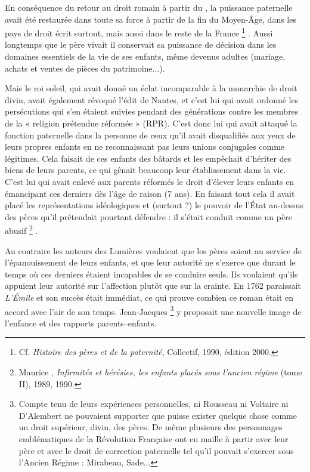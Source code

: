  En conséquence du retour au droit romain à partir du , la puissance paternelle avait été restaurée dans toute sa force à partir de la fin du Moyen-Âge, dans les pays de droit écrit surtout, mais aussi dans le reste de la France%
\footnote{Cf. \emph{Histoire des pères et de la paternité}, Collectif, 1990, édition 2000.}%
. Aussi longtemps que le père vivait il conservait sa puissance de décision dans les domaines essentiels de la vie de ses enfants, même devenus adultes (mariage, achats et ventes de pièces du patrimoine...). 

 Mais le roi soleil, qui avait donné un éclat incomparable à la monarchie de droit divin, avait également révoqué l'édit de Nantes, et c'est lui qui avait ordonné les persécutions qui s'en étaient suivies pendant des générations contre les membres de la « {religion prétendue réformée} » (RPR). C'est donc lui qui avait attaqué la fonction paternelle dans la personne de ceux qu'il avait disqualifiés aux yeux de leurs propres enfants en ne reconnaissant pas leurs unions conjugales comme légitimes. Cela faisait de ces enfants des bâtards et les empêchait d'hériter des biens de leurs parents, ce qui gênait beaucoup leur établissement dans la vie. C'est lui qui avait enlevé aux parents réformés le droit d'élever leurs enfants en émancipant ces derniers dès l'âge de raison (7 ans). En faisant tout cela il avait placé les représentations idéologiques et (surtout ?) le pouvoir de l'État au-dessus des pères qu'il prétendait pourtant défendre : il s'était conduit comme un père abusif%
\footnote{Maurice , \emph{Infirmités et hérésies, les enfants placés sous l'ancien régime} (tome II), 1989, 1990.}%
.

 Au contraire les auteurs des Lumières voulaient que les pères soient au service de l'épanouissement de leurs enfants, et que leur autorité ne s'exerce que durant le temps où ces derniers étaient incapables de se conduire seuls. Ils voulaient qu'ils appuient leur autorité sur l'affection plutôt que sur la crainte. En 1762 paraissait \emph{L'Émile} et son succès était immédiat, ce qui prouve combien ce roman était en accord avec l'air de son temps. Jean-Jacques %
\footnote{Compte tenu de leurs expériences personnelles, ni Rousseau ni Voltaire ni D'Alembert ne pouvaient supporter que puisse exister quelque chose comme un droit supérieur, divin, des pères. De même plusieurs des personnages emblématiques de la Révolution Française ont eu maille à partir avec leur père et avec le droit de correction paternelle tel qu'il pouvait s'exercer sous l'Ancien Régime : Mirabeau, Sade...} 
y proposait une nouvelle image de l'enfance et des rapports parents--enfants. 

